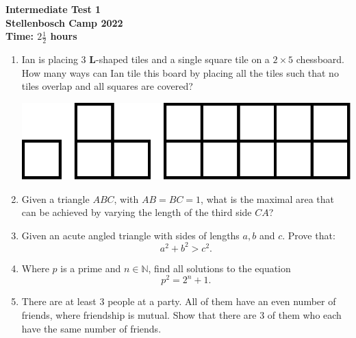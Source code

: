 \documentclass{article}
\begin{document}
\thispagestyle{empty}

\begin{center}
  \textbf{\Large Intermediate Test 1}
  \\ \vspace{1em}
  \textbf{\large Stellenbosch Camp 2022}
  \\ \vspace{1em}
  \textbf{\large Time: $2\frac{1}{2}$ hours}
\end{center}

\bigskip
\vfill

\begin{enumerate}[itemsep=\fill]

\item %
Ian is placing $3$ $\mathbf{L}$-shaped tiles and a single square tile on a $2\times5$ chessboard. How many ways can Ian tile this board by placing all the tiles such that no tiles overlap and all squares are covered?
\begin{center}
    \includegraphics[scale=0.3]{intermediate_Q1_shapes.png}
\end{center}

\vspace{0pt}


\item %
Given a triangle $ABC$, with $AB = BC = 1$, what is the maximal area that can be achieved by varying the length of the third side $CA$?


\item %
Given an acute angled triangle with sides of lengths $a,b$ and $c$. Prove that: \[a^2 + b^2 > c^2.\]

\vspace{0pt}


\item %
Where $p$ is a prime and $n\in\mathbb{N}$, find all solutions to the equation \[p^2 = 2^n + 1.\]

\vspace{0pt}


\item %
There are at least 3 people at a party. All of them have an even number of friends, where friendship is mutual. Show that there are 3 of them who each have the same number of friends.

\end{enumerate}


\vfill
\end{document}
